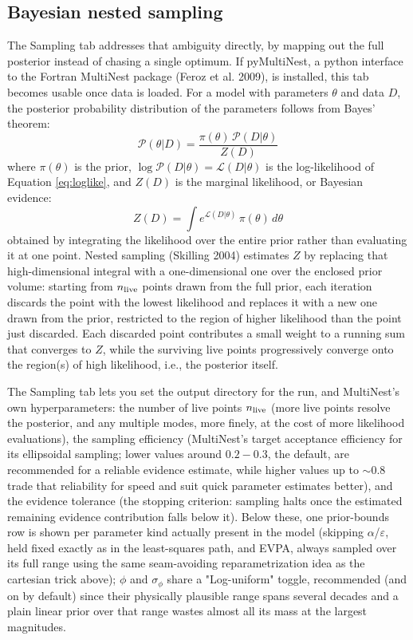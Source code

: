 \subsection{Bayesian nested sampling}
The Sampling tab addresses that ambiguity directly, by mapping out the full posterior instead of chasing a single optimum. If pyMultiNest, a python interface to the Fortran MultiNest package (Feroz et al. 2009), is installed, this tab becomes usable once data is loaded. For a model with parameters $\theta$ and data $D$, the posterior probability distribution of the parameters follows from Bayes' theorem:
\begin{equation}\label{eq:bayes}
    \displaystyle \mathcal{P}(\theta|D) = \frac{\pi(\theta)\,\mathcal{P}(D|\theta)}{Z(D)}
\end{equation}
where $\pi(\theta)$ is the prior, $\log\mathcal{P}(D|\theta)=\mathcal{L}(D|\theta)$ is the log-likelihood of Equation \ref{eq:loglike}, and $Z(D)$ is the marginal likelihood, or Bayesian evidence:
\begin{equation}\label{eq:evidence}
    \displaystyle Z(D) = \int e^{\mathcal{L}(D|\theta)}\,\pi(\theta)\,d\theta
\end{equation}
obtained by integrating the likelihood over the entire prior rather than evaluating it at one point. Nested sampling (Skilling 2004) estimates $Z$ by replacing that high-dimensional integral with a one-dimensional one over the enclosed prior volume: starting from $n_{\rm live}$ points drawn from the full prior, each iteration discards the point with the lowest likelihood and replaces it with a new one drawn from the prior, restricted to the region of higher likelihood than the point just discarded. Each discarded point contributes a small weight to a running sum that converges to $Z$, while the surviving live points progressively converge onto the region(s) of high likelihood, i.e., the posterior itself.

The Sampling tab lets you set the output directory for the run, and MultiNest's own hyperparameters: the number of live points $n_{\rm live}$ (more live points resolve the posterior, and any multiple modes, more finely, at the cost of more likelihood evaluations), the sampling efficiency (MultiNest's target acceptance efficiency for its ellipsoidal sampling; lower values around $0.2-0.3$, the default, are recommended for a reliable evidence estimate, while higher values up to $\sim0.8$ trade that reliability for speed and suit quick parameter estimates better), and the evidence tolerance (the stopping criterion: sampling halts once the estimated remaining evidence contribution falls below it). Below these, one prior-bounds row is shown per parameter kind actually present in the model (skipping $\alpha$/$\varepsilon$, held fixed exactly as in the least-squares path, and EVPA, always sampled over its full range using the same seam-avoiding reparametrization idea as the cartesian trick above); $\phi$ and $\sigma_\phi$ share a "Log-uniform" toggle, recommended (and on by default) since their physically plausible range spans several decades and a plain linear prior over that range wastes almost all its mass at the largest magnitudes.

